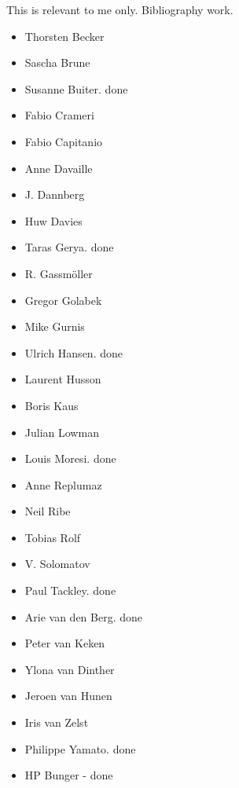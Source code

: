 
This is relevant to me only. Bibliography work.
\begin{itemize}
\item Thorsten Becker
\item Sascha Brune
\item Susanne Buiter. done
\item Fabio Crameri
\item Fabio Capitanio
\item Anne Davaille
\item J. Dannberg
\item Huw Davies
\item Taras Gerya. done
\item R. Gassm\"oller
\item Gregor Golabek
\item Mike Gurnis
\item Ulrich Hansen. done
\item Laurent Husson
\item Boris Kaus 
\item Julian Lowman
\item Louis Moresi. done
\item Anne Replumaz
\item Neil Ribe
\item Tobias Rolf
\item V. Solomatov 
\item Paul Tackley. done
\item Arie van den Berg. done
\item Peter van Keken 
\item Ylona van Dinther
\item Jeroen van Hunen
\item Iris van Zelst
\item Philippe Yamato. done
\item HP Bunger - done 
\end{itemize}
